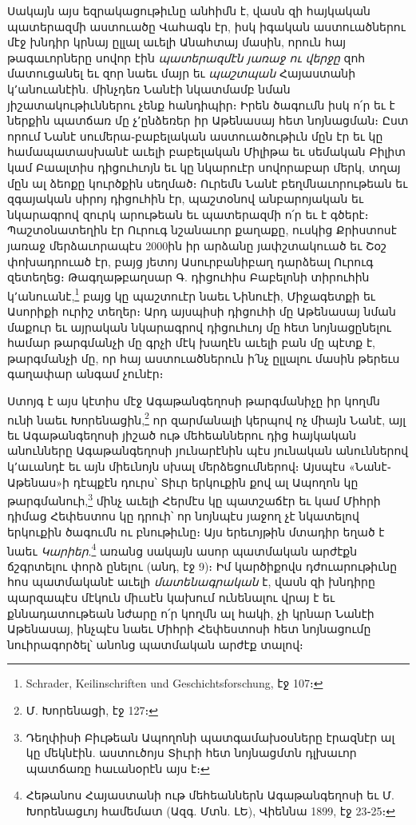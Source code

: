 \documentclass{article}
\begin{document}
{Սակայն այս եզրակացութիւնը անհիմն է, վասն զի հայկական պատերազմի աստուածը Վահագն էր, իսկ իգական աստուածներու մէջ խնդիր կրնայ ըլլալ աւելի Անահտայ մասին, որուն հայ թագաւորները սովոր էին \emph{պատերազմէն յառաջ ու վերջը} զոհ մատուցանել եւ զոր նաեւ մայր եւ \emph{պաշտպան} Հայաստանի կ՚անուանէին. մինչդեռ Նանէի նկատմամբ նման յիշատակութիւններու չենք հանդիպիր։ Իրեն ծագումն իսկ ո՛ր եւ է ներքին պատճառ մը չ՚ընձեռեր իր Աթենասայ հետ նոյնացման։ Ըստ որում Նանէ սումերա֊բաբելական աստուածութիւն մըն էր եւ կը համապատասխանէ աւելի բաբելական Միլիթա եւ սեմական Բիլիտ կամ Բաալտիս դիցուհւոյն եւ կը նկարուէր սովորաբար մերկ, տղայ մըն ալ ձեոքը կուրծքին սեղմած։ Ուրեմն Նանէ բեղմնաւորութեան եւ զգայական սիրոյ դիցուհին էր, պաշտօնով անբարոյական եւ նկարագրով զուրկ արութեան եւ պատերազմի ո՛ր եւ է գծերէ։ Պաշտօնատեղին էր Ուրուգ նշանաւոր քաղաքը, ուսկից Քրիստոսէ յառաջ մերձաւորապէս 2000ին իր արձանը յափշտակուած եւ Շօշ փոխադրուած էր, բայց յետոյ Ասուրբանիբաղ դարձեալ Ուրուգ զետեղեց։ Թագղաթբաղսար Գ. դիցուհիս Բաբելոնի տիրուհին կ՚անուանէ,\footnote{Schrader, Keilinschriften und Geschichtsforschung, էջ 107։} բայց կը պաշտուէր նաեւ Նինուէի, Միջագետքի եւ Ասորիքի ուրիշ տեղեր։ Արդ այսպիսի դիցուհի մը Աթենասայ նման մաքուր եւ այրական նկարագրով դիցուհւոյ մը հետ նոյնացընելու համար թարգմանչի մը գրչի մէկ խաղէն աւելի բան մը պէտք է, թարգմանչի մը, որ հայ աստուածներուն ի՛նչ ըլլալու մասին թերեւս գաղափար անգամ չունէր։

Ստոյգ է այս կէտիս մէջ Ագաթանգեղոսի թարգմանիչը իր կողմն ունի նաեւ Խորենացին,\footnote{Մ. Խորենացի, էջ 127։} որ զարմանալի կերպով ոչ միայն Նանէ, այլ եւ Ագաթանգեղոսի յիշած ութ մեհեաններու դից հայկական անունները Ագաթանգեղոսի յունարէնին պէս յունական անուններով կ՚աւանդէ եւ այն միեւնոյն սխալ մերձեցումներով։ Այսպէս «Նանէ֊Աթենաս»ի դէպքէն դուրս՝ Տիւր երկուքին քով ալ Ապողոն կը թարգմանուի,\footnote{Դեղփիսի Բիւթեան Ապողոնի պատգամախօսները էրազնէր ալ կը մեկնէին. աստուծոյս Տիւրի հետ նոյնացմտն դլխաւոր պատճառը հաւանօրէն այս է։} մինչ աւելի Հերմէս կը պատշաճէր եւ կամ Միհրի դիմաց Հեփեստոս կը դրուի՝ որ նոյնպէս յաջող չէ նկատելով երկուքին ծագումն ու բնութիւնը։ Այս երեւոյթին մտադիր եղած է նաեւ \emph{Կարիեր}.\footnote{Հեթանոս Հայաստանի ութ մեհեաններն Ագաթանգեղոսի եւ Մ. Խորենացւոյ համեմատ (Ազգ. Մտն. ԼԵ), Վիեննա 1899, էջ 23֊25։} առանց սակայն ասոր պատմական արժէքն ճշգրտելու փորձ ընելու (անդ, էջ 9)։ Իմ կարծիքովս դժուարութիւնը հոս պատմականէ աւելի \emph{մատենագրական} է, վասն զի խնդիրը պարզապէս մէկուն միւսէն կախում ունենալու վրայ է եւ քննադատութեան նժարը ո՛ր կողմն ալ հակի, չի կրնար Նանէի Աթենասայ, ինչպէս նաեւ Միհրի Հեփեստոսի հետ նոյնացումը նուիրագործել՝ անոնց պատմական արժէք տալով։

}
\end{document}
